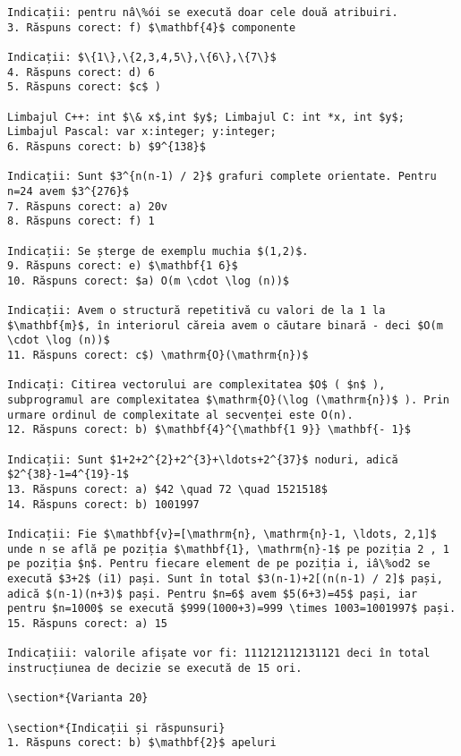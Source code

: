 \begin{verbatim}
Indicații: pentru nâ\%ói se execută doar cele două atribuiri.
3. Răspuns corect: f) $\mathbf{4}$ componente

Indicații: $\{1\},\{2,3,4,5\},\{6\},\{7\}$
4. Răspuns corect: d) 6
5. Răspuns corect: $c$ )

Limbajul C++: int $\& x$,int $y$; Limbajul C: int *x, int $y$;
Limbajul Pascal: var x:integer; y:integer;
6. Răspuns corect: b) $9^{138}$

Indicații: Sunt $3^{n(n-1) / 2}$ grafuri complete orientate. Pentru n=24 avem $3^{276}$
7. Răspuns corect: a) 20v
8. Răspuns corect: f) 1

Indicații: Se șterge de exemplu muchia $(1,2)$.
9. Răspuns corect: e) $\mathbf{1 6}$
10. Răspuns corect: $a) O(m \cdot \log (n))$

Indicații: Avem o structură repetitivă cu valori de la 1 la $\mathbf{m}$, în interiorul căreia avem o căutare binară - deci $O(m \cdot \log (n))$
11. Răspuns corect: c$) \mathrm{O}(\mathrm{n})$

Indicați: Citirea vectorului are complexitatea $O$ ( $n$ ), subprogramul are complexitatea $\mathrm{O}(\log (\mathrm{n})$ ). Prin urmare ordinul de complexitate al secvenței este O(n).
12. Răspuns corect: b) $\mathbf{4}^{\mathbf{1 9}} \mathbf{- 1}$

Indicații: Sunt $1+2+2^{2}+2^{3}+\ldots+2^{37}$ noduri, adică $2^{38}-1=4^{19}-1$
13. Răspuns corect: a) $42 \quad 72 \quad 1521518$
14. Răspuns corect: b) 1001997

Indicații: Fie $\mathbf{v}=[\mathrm{n}, \mathrm{n}-1, \ldots, 2,1]$ unde n se află pe poziția $\mathbf{1}, \mathrm{n}-1$ pe poziția 2 , 1 pe poziția $n$. Pentru fiecare element de pe poziția i, iâ\%od2 se execută $3+2$ (i1) pași. Sunt în total $3(n-1)+2[(n(n-1) / 2]$ pași, adică $(n-1)(n+3)$ pași. Pentru $n=6$ avem $5(6+3)=45$ pași, iar pentru $n=1000$ se execută $999(1000+3)=999 \times 1003=1001997$ pași.
15. Răspuns corect: a) 15

Indicațiii: valorile afișate vor fi: 111212112131121 deci în total instrucțiunea de decizie se execută de 15 ori.

\section*{Varianta 20}

\section*{Indicații și răspunsuri}
1. Răspuns corect: b) $\mathbf{2}$ apeluri


\end{verbatim}
